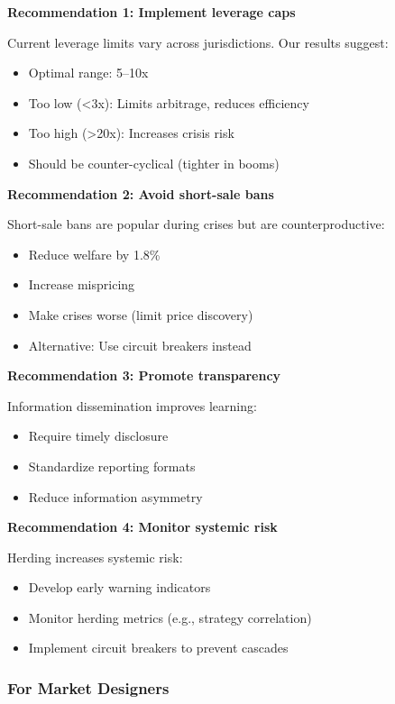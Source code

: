 \textbf{Recommendation 1: Implement leverage caps}

Current leverage limits vary across jurisdictions. Our results suggest:
\begin{itemize}
    \item Optimal range: 5--10x
    \item Too low (<3x): Limits arbitrage, reduces efficiency
    \item Too high (>20x): Increases crisis risk
    \item Should be counter-cyclical (tighter in booms)
\end{itemize}

\textbf{Recommendation 2: Avoid short-sale bans}

Short-sale bans are popular during crises but are counterproductive:
\begin{itemize}
    \item Reduce welfare by 1.8\%
    \item Increase mispricing
    \item Make crises worse (limit price discovery)
    \item Alternative: Use circuit breakers instead
\end{itemize}

\textbf{Recommendation 3: Promote transparency}

Information dissemination improves learning:
\begin{itemize}
    \item Require timely disclosure
    \item Standardize reporting formats
    \item Reduce information asymmetry
\end{itemize}

\textbf{Recommendation 4: Monitor systemic risk}

Herding increases systemic risk:
\begin{itemize}
    \item Develop early warning indicators
    \item Monitor herding metrics (e.g., strategy correlation)
    \item Implement circuit breakers to prevent cascades
\end{itemize}

\subsubsection{For Market Designers}

